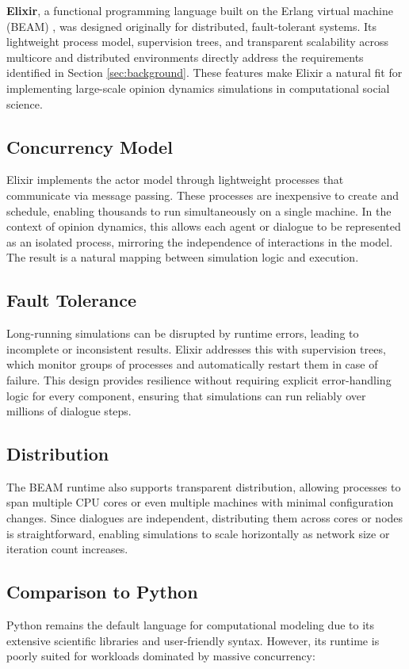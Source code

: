 \documentclass[
]{ceurart}
\begin{document}
\textbf{Elixir}, a functional programming language built on the Erlang virtual machine (BEAM) \cite{Elixir2025}, was designed originally for distributed, fault-tolerant systems. Its lightweight process model, supervision trees, and transparent scalability across multicore and distributed environments directly address the requirements identified in Section \ref{sec:background}. These features make Elixir a natural fit for implementing large-scale opinion dynamics simulations in computational social science.

\subsection{Concurrency Model}
Elixir implements the actor model through lightweight processes that communicate via message passing. These processes are inexpensive to create and schedule, enabling thousands to run simultaneously on a single machine. In the context of opinion dynamics, this allows each agent or dialogue to be represented as an isolated process, mirroring the independence of interactions in the model. The result is a natural mapping between simulation logic and execution.

\subsection{Fault Tolerance}
Long-running simulations can be disrupted by runtime errors, leading to incomplete or inconsistent results. Elixir addresses this with supervision trees, which monitor groups of processes and automatically restart them in case of failure. This design provides resilience without requiring explicit error-handling logic for every component, ensuring that simulations can run reliably over millions of dialogue steps.

\subsection{Distribution}
The BEAM runtime also supports transparent distribution, allowing processes to span multiple CPU cores or even multiple machines with minimal configuration changes. Since dialogues are independent, distributing them across cores or nodes is straightforward, enabling simulations to scale horizontally as network size or iteration count increases.

\subsection{Comparison to Python}
Python remains the default language for computational modeling due to its extensive scientific libraries and user-friendly syntax. However, its runtime is poorly suited for workloads dominated by massive concurrency:
\end{document}
